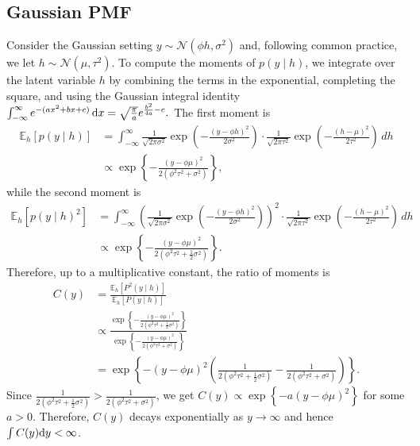 \subsection{Gaussian PMF}

Consider the Gaussian setting $y \sim \mathcal{N}(\phi h, \sigma^2)$
and, following common practice, we let $h \sim \mathcal{N}(\mu, \tau^2)$. 
To compute the moments of $p(y \mid h)$, we integrate over the latent variable $h$ by combining the terms in the exponential, completing the square, and using the Gaussian integral identity
$\int_{-\infty}^{\infty} e^{-(a x^2 + b x + c)} \, \mathrm{d} x = \sqrt{\frac{\pi}{a}} e^{\frac{b^2}{4a} - c}.$ 
The first moment is 
% 
\begin{align}
\mathbb{E}_h [p(y \mid h)] 
&= \int_{-\infty}^{\infty} \frac{1}{\sqrt{2\pi\sigma^2}} \exp\left(-\frac{(y - \phi h)^2}{2\sigma^2} \right)
\cdot \frac{1}{\sqrt{2\pi\tau^2}} \exp\left(-\frac{(h - \mu)^2}{2\tau^2} \right) \, dh \\
&\propto \exp\left\{ -\frac{(y - \phi \mu)^2}{2(\phi^2 \tau^2 + \sigma^2)} \right\},
\end{align}
while the second moment is 
\begin{align}
\mathbb{E}_h [p(y \mid h)^2] 
&= \int_{-\infty}^{\infty} \left( \frac{1}{\sqrt{2\pi\sigma^2}} \exp\left(-\frac{(y - \phi h)^2}{2\sigma^2} \right) \right)^2
\cdot \frac{1}{\sqrt{2\pi\tau^2}} \exp\left(-\frac{(h - \mu)^2}{2\tau^2} \right) \, dh \\
&\propto \exp\left\{ -\frac{(y - \phi \mu)^2}{2(\phi^2 \tau^2 + \frac{1}{2}\sigma^2)} \right\}.
\end{align}
Therefore, up to a multiplicative constant, the ratio of moments is 
\begin{align}
    C(y) 
    &= \frac{\mathbb{E}_{h}[P^{2}(y\mid h)]}{\mathbb{E}_{h}[P(y\mid h)]} \\
    &\propto \frac{ \exp\left\{ -\frac{(y - \phi \mu)^2}{2(\phi^2 \tau^2 + \frac{1}{2}\sigma^2)} \right\} }{ \exp\left\{ -\frac{(y - \phi \mu)^2}{2(\phi^2 \tau^2 + \sigma^2)} \right\} }\\
    &= \exp\left\{ -(y - \phi \mu)^2 \left( \frac{1}{2(\phi^2 \tau^2 + \frac{1}{2}\sigma^2)} - \frac{1}{2(\phi^2 \tau^2 + \sigma^2)} \right) \right\}.
\end{align}
Since $\frac{1}{2(\phi^2 \tau^2 + \frac{1}{2}\sigma^2)} > \frac{1}{2(\phi^2 \tau^2 + \sigma^2)}$, 
we get $C(y) \propto \exp\left\{ -a (y - \phi \mu)^2 \right\}$ for some $a > 0$. Therefore,
$C(y)$ decays exponentially as $y \to \infty$ and hence $\int C(y)\d y <\infty$.  


